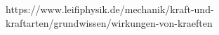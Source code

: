 \documentclass[preview]{standalone}
\begin{document}
\begin{center}
https://www.leifiphysik.de/mechanik/kraft-und-kraftarten/grundwissen/wirkungen-von-kraeften
\end{center}
\end{document}
